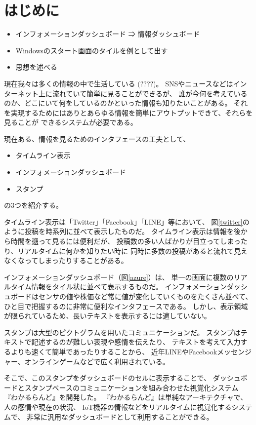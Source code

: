 \section{はじめに}

\begin{itemize}
\item インフォメーションダッシュボード ⇒ 情報ダッシュボード
\item Windowsのスタート画面のタイルを例として出す
\item 思想を述べる
\end{itemize}
\cite{kurihara2016}
\cite{few}


現在我々は多くの情報の中で生活している (????)。
SNSやニュースなどはインターネット上に流れていて簡単に見ることができるが、
誰が今何を考えているのか、どこにいて何をしているのかといった情報も知りたいことがある。
それを実現するためにはありとあらゆる情報を簡単にアウトプットできて、それらを見ることが
できるシステムが必要である。

現在ある、情報を見るためのインタフェースの工夫として、
\begin{itemize}
\item タイムライン表示
\item インフォメーションダッシュボード
\item スタンプ
\end{itemize}
の3つを紹介する。

タイムライン表示は「Twitter」「Facebook」「LINE」等において、
図\ref{twitter}のように投稿を時系列に並べて表示したものだ。
タイムライン表示は情報を後から時間を遡って見るには便利だが、
投稿数の多い人ばかりが目立ってしまったり、リアルタイムに何かを知りたい時に
同時に多数の投稿があると流れて見えなくなってしまったりすることがある。

インフォメーションダッシュボード（図\ref{azure}）は、
単一の画面に複数のリアルタイム情報をタイル状に並べて表示するものだ。
インフォメーションダッシュボードはセンサの値や株価など常に値が変化していくものをたくさん並べて、
ひと目で把握するのに非常に便利なインタフェースである。
しかし、表示領域が限られているため、長いテキストを表示するには適していない。

スタンプは大型のピクトグラムを用いたコミュニケーションだ。
スタンプはテキストで記述するのが難しい表現や感情を伝えたり、
テキストを考えて入力するよりも速くて簡単であったりすることから、
近年LINEやFacebookメッセンジャー、オンラインゲームなどで広く利用されている。

そこで、このスタンプをダッシュボードのセルに表示することで、
ダッシュボードとスタンプベースのコミュニケーションを組み合わせた視覚化システム
『わかるらんど』を開発した。
『わかるらんど』は単純なアーキテクチャで、人の感情や現在の状況、
IoT機器の情報などをリアルタイムに視覚化するシステムで、
非常に汎用なダッシュボードとして利用することができる。

